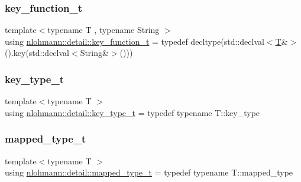 \subsubsection{\texorpdfstring{key\_function\_t}{key\_function\_t}}
{\footnotesize\ttfamily template$<$typename T , typename String $>$ \\
using \mbox{\hyperlink{namespacenlohmann_1_1detail_a44869ca9f422b260625d78e4e8121559}{nlohmann\+::detail\+::key\+\_\+function\+\_\+t}} = typedef decltype(std\+::declval$<$\mbox{\hyperlink{_keyboard_event_8h_adf1f3edb9115acb0a1e04209b7a9937b}{T}}\&$>$().key(std\+::declval$<$String\&$>$()))}

\mbox{\label{namespacenlohmann_1_1detail_a66dfe39f03b05d6b7265a0ff748d64ef}} 
\subsubsection{\texorpdfstring{key\_type\_t}{key\_type\_t}}
{\footnotesize\ttfamily template$<$typename T $>$ \\
using \mbox{\hyperlink{namespacenlohmann_1_1detail_a66dfe39f03b05d6b7265a0ff748d64ef}{nlohmann\+::detail\+::key\+\_\+type\+\_\+t}} = typedef typename T\+::key\+\_\+type}

\mbox{\label{namespacenlohmann_1_1detail_a9c1795c148875722f8482d39e0eb9364}} 
\subsubsection{\texorpdfstring{mapped\_type\_t}{mapped\_type\_t}}
{\footnotesize\ttfamily template$<$typename T $>$ \\
using \mbox{\hyperlink{namespacenlohmann_1_1detail_a9c1795c148875722f8482d39e0eb9364}{nlohmann\+::detail\+::mapped\+\_\+type\+\_\+t}} = typedef typename T\+::mapped\+\_\+type}

\mbox{\label{namespacenlohmann_1_1detail_ac1b4e524746bf8b790b2b776048b93c4}} 
